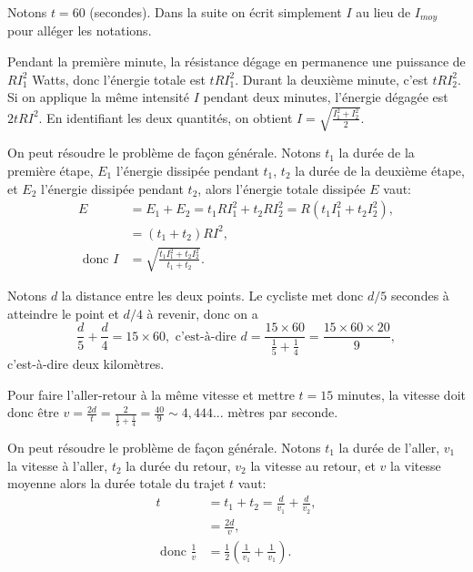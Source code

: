 \begin{Soln}{55}
Notons $t=60$ (secondes). Dans la suite on écrit simplement $I$ au lieu de $I_{moy}$ pour alléger les notations.

Pendant la première minute, la résistance dégage en permanence une puissance de $RI_1^2$ Watts, donc l'énergie totale est $tRI_1^2$. Durant la deuxième minute, c'est $tRI_2^2$.
Si on applique la même intensité $I$ pendant deux minutes, l'énergie dégagée est $2tRI^2$. En identifiant les deux quantités, on obtient $I = \sqrt{\frac{I_1^2+I_2^2}{2}}$.

On peut résoudre le problème de façon générale. Notons $t_1$ la durée de la première étape, $E_1$ l'énergie dissipée pendant $t_1$, $t_2$ la durée de la deuxième étape, et $E_2$ l'énergie dissipée pendant $t_2$, alors l'énergie totale dissipée $E$ vaut:
\begin{align*}
E &= E_1+E_2= t_1 R I_1^2 + t_2 R I_2^2= R (t_1 I_1^2 + t_2 I_2^2), \\
& = (t_1+t_2)RI^2, \\
\text{ donc } I & =\sqrt{\frac{t_1I_1^2 + t_2I_2^2}{t_1+t_2}}.
\end{align*}
\end{Soln}
\begin{Soln}{56}
Notons $d$ la distance entre les deux points. Le cycliste met donc $d/5$ secondes à atteindre le point et $d/4$ à revenir, donc on a
\[ \frac{d}{5}+\frac{d}{4}=15\times 60,
\text{ c'est-à-dire }
d=\frac{15\times 60}{\frac15+\frac14} = \frac{15\times 60\times 20}{9},
\]
c'est-à-dire deux kilomètres.

Pour faire l'aller-retour à la même vitesse et mettre $t=15$ minutes, la vitesse doit donc être $v=\frac{2d}{t}=\frac{2}{\frac15+\frac14} = \frac{40}{9}\sim 4,444...$ mètres par seconde.

On peut résoudre le problème de façon générale. Notons $t_1$ la durée de l'aller, $v_1$ la vitesse à l'aller, $t_2$ la durée du retour,  $v_2$ la vitesse au retour, et $v$ la vitesse moyenne alors la durée totale du trajet $t$ vaut:
\begin{align*}
t &= t_1+t_2=\frac{d}{v_1}+\frac{d}{v_2}, \\
& = \frac{2d}{v}, \\
\text{ donc } \frac1v & =\frac12 \left( \frac1{v_1}+\frac1{v_1} \right).
\end{align*}
\end{Soln}
